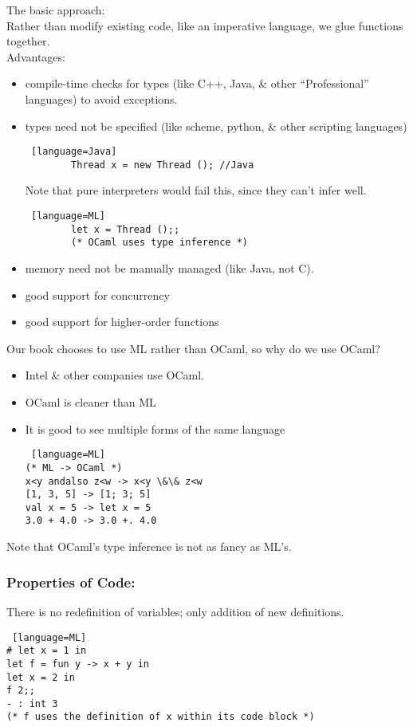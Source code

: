 \documentclass[../../lecture_notes.tex]{subfiles}
\begin{document}
\noindent The basic approach:\\
Rather than modify existing code, like an imperative language, we glue functions together.\\
Advantages:
\begin{itemize}
	\item compile-time checks for types (like C++, Java, \& other “Professional” languages) to avoid exceptions.
	\item types need not be specified (like scheme, python, \& other scripting languages)
		\begin{lstlisting} [language=Java]
		Thread x = new Thread (); //Java
		\end{lstlisting}
		Note that pure interpreters would fail this, since they can’t infer well.
		\begin{lstlisting} [language=ML]
		let x = Thread ();;
		(* OCaml uses type inference *)
		\end{lstlisting}
	\item memory need not be manually managed (like Java, not C).
	\item good support for concurrency
	\item good support for higher-order functions
\end{itemize}
\noindent Our book chooses to use ML rather than OCaml, so why do we use OCaml?
\begin{itemize} [itemsep=0mm]
	\item Intel \& other companies use OCaml.
	\item OCaml is cleaner than ML
	\item It is good to see multiple forms of the same language
	\begin{lstlisting} [language=ML]
(* ML -> OCaml *)
x<y andalso z<w -> x<y \&\& z<w
[1, 3, 5] -> [1; 3; 5]
val x = 5 -> let x = 5
3.0 + 4.0 -> 3.0 +. 4.0
	\end{lstlisting}
\end{itemize}
\noindent Note that OCaml’s type inference is not as fancy as ML’s. \medskip

\subsubsection*{Properties of Code:}
There is no redefinition of variables; only addition of new definitions.
\begin{lstlisting} [language=ML]
# let x = 1 in
let f = fun y -> x + y in
let x = 2 in
f 2;;
- : int 3
(* f uses the definition of x within its code block *)
\end{lstlisting} \medskip
\end{document}
